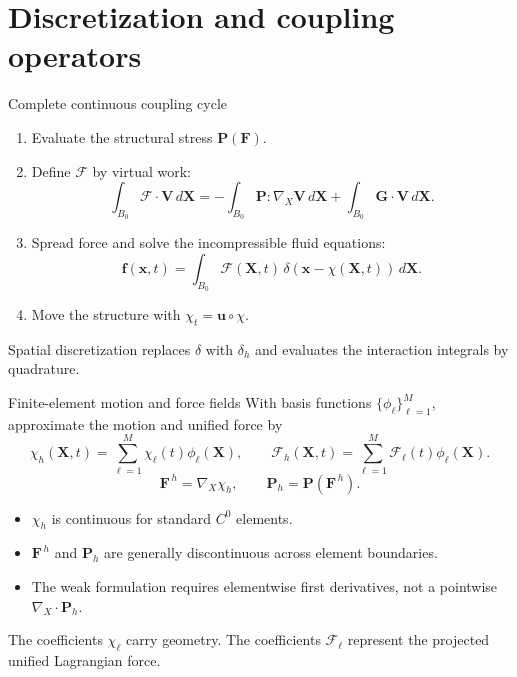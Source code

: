 \documentclass[aspectratio=169,11pt]{beamer}
\newcommand{\xvec}{\bm{x}}
\newcommand{\Xvec}{\bm{X}}
\newcommand{\uvec}{\bm{u}}
\newcommand{\fvec}{\bm{f}}
\newcommand{\Fvec}{\bm{\mathcal{F}}}
\newcommand{\Gvec}{\bm{G}}
\newcommand{\Vvec}{\bm{V}}
\newcommand{\Ften}{\bm{F}}
\newcommand{\Pten}{\bm{P}}
\newcommand{\Grad}{\nabla_{\!X}}
\newcommand{\Div}{\nabla_{\!X}\!\cdot}
\begin{document}
\section{Discretization and coupling operators}

\begin{frame}{Complete continuous coupling cycle}
\begin{enumerate}\itemsep6pt
  \item Evaluate the structural stress \(\Pten(\Ften)\).
  \item Define \(\Fvec\) by virtual work:
  \[
    \int_{B_0}\Fvec\cdot\Vvec\,d\Xvec
    =-\int_{B_0}\Pten:\Grad\Vvec\,d\Xvec
    +\int_{B_0}\Gvec\cdot\Vvec\,d\Xvec .
  \]
  \item Spread force and solve the incompressible fluid equations:
  \[
    \fvec(\xvec,t)=\int_{B_0}\Fvec(\Xvec,t)\,
    \delta(\xvec-\chi(\Xvec,t))\,d\Xvec .
  \]
  \item Move the structure with \(\chi_t=\uvec\circ\chi\).
\end{enumerate}
\medskip
\begin{punchbox}
\small Spatial discretization replaces \(\delta\) with \(\delta_h\) and evaluates the interaction integrals by quadrature.
\end{punchbox}
\end{frame}

\begin{frame}{Finite-element motion and force fields}
\small
With basis functions \(\{\phi_\ell\}_{\ell=1}^{M}\), approximate the motion and unified force by
\[
  \chi_h(\Xvec,t)=\sum_{\ell=1}^{M}\chi_\ell(t)\phi_\ell(\Xvec),
  \qquad
  \Fvec_h(\Xvec,t)=\sum_{\ell=1}^{M}\Fvec_\ell(t)\phi_\ell(\Xvec).
\]
\[
  \Ften^{\,h}=\Grad\chi_h,
  \qquad
  \Pten_h=\Pten(\Ften^{\,h}).
\]
\begin{itemize}\itemsep6pt
  \item \(\chi_h\) is continuous for standard \(C^0\) elements.
  \item \(\Ften^{\,h}\) and \(\Pten_h\) are generally discontinuous across element boundaries.
  \item The weak formulation requires elementwise first derivatives, not a pointwise \(\Div\Pten_h\).
\end{itemize}
\medskip
\begin{punchbox}
\small The coefficients \(\chi_\ell\) carry geometry. The coefficients \(\Fvec_\ell\) represent the projected unified Lagrangian force.
\end{punchbox}
\end{frame}
\end{document}

